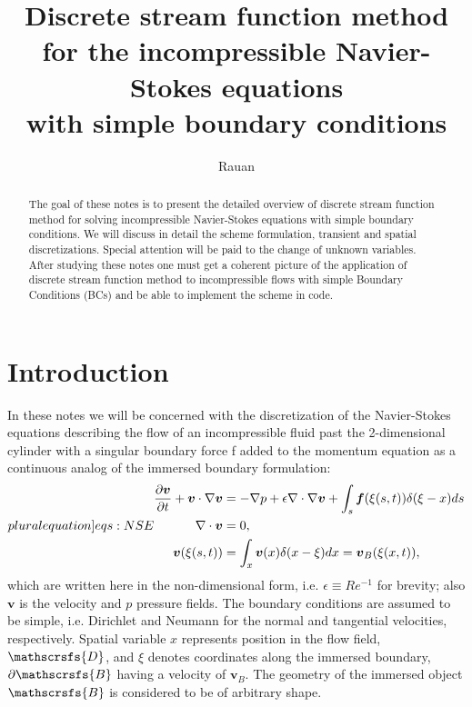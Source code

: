 \documentclass{article}
\title{Discrete stream function method \\ for the incompressible Navier-Stokes equations \\with simple boundary conditions}
\author{Rauan}
\numberwithin{equation}{section}
\begin{document}
\maketitle

\begin{abstract}
The goal of these notes is to present the detailed overview of discrete stream function method for solving incompressible Navier-Stokes equations with simple boundary conditions. We will discuss in detail the scheme formulation, transient and spatial discretizations. Special attention will be paid to the change of unknown variables. After studying these notes one must get a coherent picture of the application of discrete stream function method to incompressible flows with simple Boundary Conditions (BCs) and be able to implement the scheme in code.
\end{abstract}

\tableofcontents

\section{Introduction}\label{sec:introduction}

In these notes we will be concerned with the discretization of the Navier-Stokes equations describing the flow of an incompressible fluid past the 2-dimensional cylinder with a singular boundary force f added to the momentum equation as a continuous analog of the immersed boundary formulation:
\begin{subequations}
\label[pluralequation]{eqs:NSE}
\begin{align}
\label{eqn:momentum-intro}
\frac{\partial \boldsymbol{v}}{\partial t} + \boldsymbol{v} \cdot \nabla \boldsymbol{v} &= -\nabla p + \epsilon \nabla \cdot \nabla \boldsymbol{v} +\int_{s}\boldsymbol{f}(\xi(s,t))\delta(\xi-x)ds\\
\label{eqn:continuity}
\nabla \cdot \boldsymbol{v} &= 0,\\
\boldsymbol{v}(\xi(s,t)) &= \int_x\boldsymbol{v}(x)\delta(x - \xi)dx = \boldsymbol{v}_B(\xi(x,t)),
\end{align}
\end{subequations}
which are written here in the non-dimensional form, i.e. $\epsilon \equiv Re^{-1}$ for brevity; also $\boldsymbol{v}$ is the velocity and $p$ pressure fields. The boundary conditions are assumed to be simple, i.e.  Dirichlet and Neumann for the normal and tangential velocities, respectively. Spatial variable $x$ represents position in the flow field, $\mathscrsfs{D}$, and $\xi$ denotes coordinates along the immersed boundary, $\partial \mathscrsfs{B}$ having a velocity of $\boldsymbol{v}_B$. The geometry of the immersed object $\mathscrsfs{B}$ is considered to be of arbitrary shape. 
\end{document}
